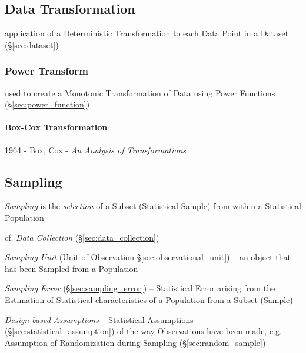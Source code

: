 \subsection{Data Transformation}\label{sec:data_transformation}

application of a Deterministic Transformation to each Data Point in a Dataset
(\S\ref{sec:dataset})



\subsubsection{Power Transform}\label{sec:power_transform}

used to create a Monotonic Transformation of Data using Power Functions
(\S\ref{sec:power_function})



\paragraph{Box-Cox Transformation}\label{sec:boxcox_transformation}\hfill

1964 - Box, Cox - \emph{An Analysis of Transformations}



\subsection{Sampling}\label{sec:sampling}

\emph{Sampling} is the \emph{selection} of a Subset (Statistical Sample) from
within a Statistical Population

\fist cf. \emph{Data Collection} (\S\ref{sec:data_collection})

\fist \emph{Sampling Unit} (Unit of Observation \S\ref{sec:observational_unit})
-- an object that has been Sampled from a Population

\fist \emph{Sampling Error} (\S\ref{sec:sampling_error}) -- Statistical Error
arising from the Estimation of Statistical characteristics of a Population from
a Subset (Sample)

\fist \emph{Design-based Assumptions} -- Statistical Assumptions
(\S\ref{sec:statistical_assumption}) of the way Observations have been made,
e.g. Assumption of Randomization during Sampling (\S\ref{sec:random_sample})

